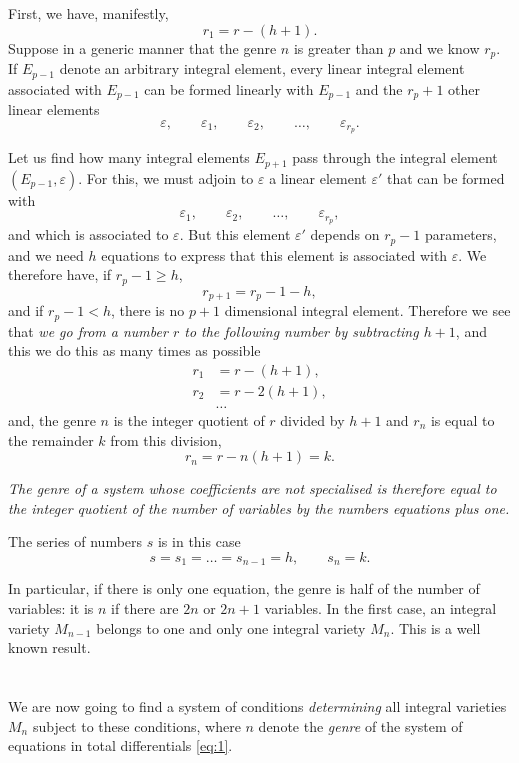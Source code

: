 \documentclass[leqno,11pt]{book}
\makeatletter
\theoremstyle{shape1}
\theoremstyle{shapesmall}
\let\old@epsilon\epsilon
\let\old@varepsilon\varepsilon
\let\epsilon\old@varepsilon
\let\varepsilon\old@epsilon
\makeatother
\begin{document}
First, we have, manifestly,
\[
r_{1}=r-(h+1).
\]
Suppose in a generic manner that the genre $n$ is greater than $p$ and we know $r_{p}$. If $E_{p-1}$ denote an arbitrary integral element, every linear integral element associated with $E_{p-1}$ can be formed linearly with $E_{p-1}$ and the $r_{p}+1$ other linear elements
\[
\epsilon,\qquad\epsilon_{1},\qquad\epsilon_{2},\qquad\dots,\qquad\epsilon_{r_{p}}.
\]

Let us find how many integral elements $E_{p+1}$ pass through the integral element $(E_{p-1},\epsilon)$. For this, we must adjoin to $\epsilon$ a linear element $\epsilon'$ that can be formed with
\[
\epsilon_{1},\qquad\epsilon_{2},\qquad\dots,\qquad\epsilon_{r_{p}},
\]
and which is associated to $\epsilon$. But this element $\epsilon'$ depends on $r_{p}-1$ parameters, and we need $h$ equations to express that this element is associated with $\epsilon$. We therefore have, if $r_{p}-1\ge h$,
\[
r_{p+1}=r_{p}-1-h,
\]
and if $r_{p}-1<h$, there is no $p+1$ dimensional integral element. Therefore we see that \emph{we go from a number $r$ to the following number by subtracting $h+1$}, and this we do this as many times as possible
\begin{align*}
  r_{1}&=r-(h+1),\\
  r_{2}&=r-2(h+1),\\
  &\dots
\end{align*}
and, the genre $n$ is the integer quotient of $r$ divided by $h+1$ and $r_{n}$ is equal to the remainder $k$ from this division,
\[
r_{n}=r-n(h+1)=k.
\]

\emph{The genre of a system whose coefficients are not specialised is therefore equal to the integer quotient of the number of variables by the numbers equations plus one.}

The series of numbers $s$ is in this case
\[
s=s_{1}=\dots=s_{n-1}=h,\qquad s_{n}=k.
\]

In particular, if there is only one equation, the genre is half of the number of variables: it is $n$ if there are $2n$ or $2n+1$ variables. In the first case, an integral variety $M_{n-1}$ belongs to one and only one integral variety $M_{n}$. This is a well known result.

\section{}
\label{sec:6}

We are now going to find a system of conditions \emph{determining} all integral varieties $M_{n}$ subject to these conditions, where $n$ denote the \emph{genre} of the system of equations in total differentials \eqref{eq:1}.
\end{document}

